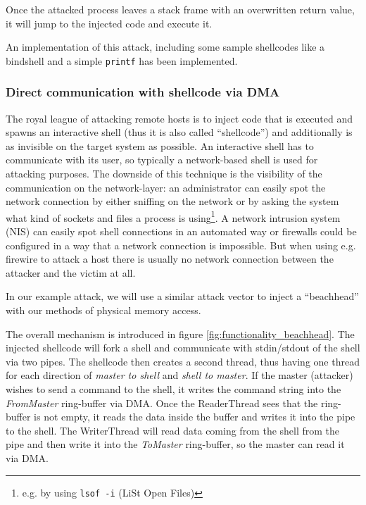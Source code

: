 Once the attacked process leaves a stack frame with an overwritten return value,
it will jump to the injected code and execute it.

An implementation of this attack, including some sample shellcodes like a
bindshell and a simple \texttt{printf} has been implemented. %


\subsubsection{Direct communication with shellcode via DMA}

\label{communication_DMA} The royal league of attacking remote hosts is to
inject code that is executed and spawns an interactive shell (thus it is also
called ``shellcode'') and additionally is as invisible on the target system as
possible.  An interactive shell has to communicate with its user, so typically a
network-based shell is used for attacking purposes. The downside of this
technique is the visibility of the communication on the network-layer: an
administrator can easily spot the network connection by either sniffing on the
network or by asking the system what kind of sockets and files a process is
using\footnote{e.g\@. by using \texttt{lsof -i} (LiSt Open Files)}. A network
intrusion system (NIS) can easily spot shell connections in an automated way or
firewalls could be configured in a way that a network connection is impossible.
But when using e.g\@. firewire to attack a host there is usually no network
connection between the attacker and the victim at all.

In our example attack, we will use a similar attack vector to inject a
``beachhead'' with our methods of physical memory access.

The overall mechanism is introduced in figure \ref{fig:functionality_beachhead}.
The injected shellcode will fork a shell and communicate with stdin/stdout of
the shell via two pipes. The shellcode then creates a second thread, thus having
one thread for each direction of \emph{master to shell} and \emph{shell to
master}. If the master (attacker) wishes to send a command to the shell, it
writes the command string into the \emph{FromMaster} ring-buffer via DMA.  Once
the ReaderThread sees that the ring-buffer is not empty, it reads the data
inside the buffer and writes it into the pipe to the shell.  The WriterThread
will read data coming from the shell from the pipe and then write it into the
\emph{ToMaster} ring-buffer, so the master can read it via DMA.

